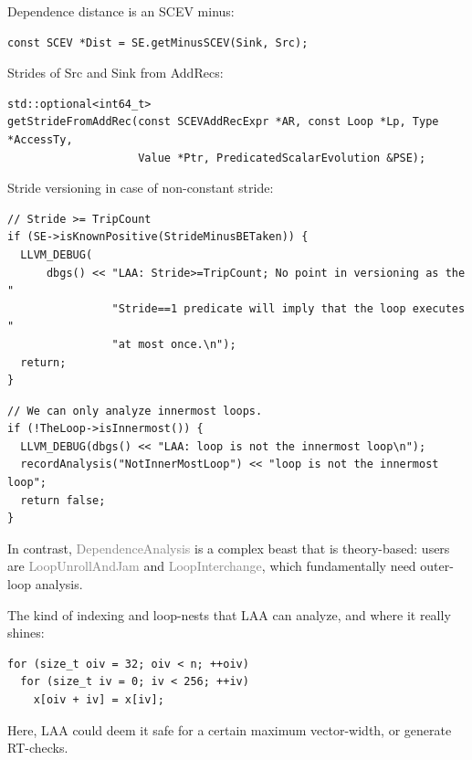 \documentclass{beamer}
\begin{document}
\begin{frame}[containsverbatim]
  Dependence distance is an SCEV minus:
  \begin{verbatim}
const SCEV *Dist = SE.getMinusSCEV(Sink, Src);
  \end{verbatim}
  \vspace{2em}
  Strides of Src and Sink from AddRecs:
  \begin{verbatim}
std::optional<int64_t>
getStrideFromAddRec(const SCEVAddRecExpr *AR, const Loop *Lp, Type *AccessTy,
                    Value *Ptr, PredicatedScalarEvolution &PSE);
  \end{verbatim}
  \vspace{2em}
  Stride versioning in case of non-constant stride:
  \begin{verbatim}
// Stride >= TripCount
if (SE->isKnownPositive(StrideMinusBETaken)) {
  LLVM_DEBUG(
      dbgs() << "LAA: Stride>=TripCount; No point in versioning as the "
                "Stride==1 predicate will imply that the loop executes "
                "at most once.\n");
  return;
}
  \end{verbatim}
\end{frame}

\begin{frame}[containsverbatim]
  \begin{verbatim}
// We can only analyze innermost loops.
if (!TheLoop->isInnermost()) {
  LLVM_DEBUG(dbgs() << "LAA: loop is not the innermost loop\n");
  recordAnalysis("NotInnerMostLoop") << "loop is not the innermost loop";
  return false;
}
\end{verbatim}

  \vspace{1em}

  In contrast, \textcolor{gray}{DependenceAnalysis} is a complex beast that is theory-based: users are \textcolor{gray}{LoopUnrollAndJam} and \textcolor{gray}{LoopInterchange}, which fundamentally need outer-loop analysis.
\end{frame}

\begin{frame}[containsverbatim]
  The kind of indexing and loop-nests that LAA can analyze, and where it really shines:

  \vspace{1em}

  \begin{verbatim}
for (size_t oiv = 32; oiv < n; ++oiv)
  for (size_t iv = 0; iv < 256; ++iv)
    x[oiv + iv] = x[iv];
  \end{verbatim}

  \vspace{1em}

  Here, LAA could deem it safe for a certain maximum vector-width, or generate RT-checks.
\end{frame}
\end{document}
